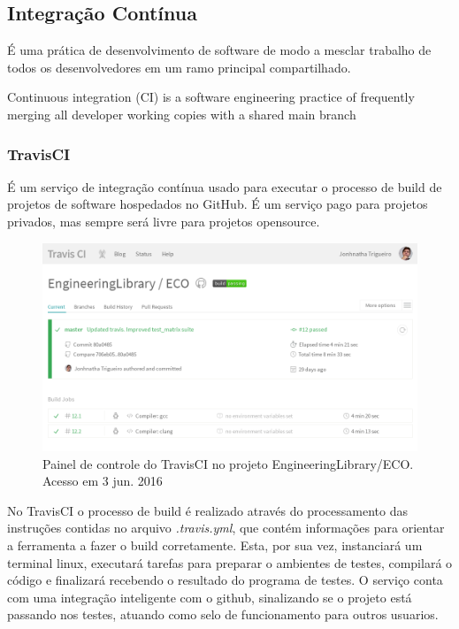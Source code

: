 \documentclass[
	article,			%
	12pt,				%
	oneside,			%
	a4paper,			%
	english,			
	brazil,
	sumario=tradicional
	]{abntex2}
\begin{document}
\pagebreak
\subsection{Integração Contínua}
É uma prática de desenvolvimento de software de modo a mesclar trabalho de todos os desenvolvedores em um ramo principal compartilhado.

\begin{citacao}
Continuous  integration  (CI)  is  a  software  engineering practice of frequently merging all developer working copies with  a  shared  main  branch
	\cite[Introduction]{vasilescu2015continuous}
\end{citacao}

\subsubsection{TravisCI}
É um serviço de integração contínua usado para executar o processo de build de projetos de software hospedados no GitHub. É um serviço pago para projetos privados, mas sempre será livre para projetos opensource. 

\begin{figure}[!h]
\centering
\includegraphics[scale=0.4]{images/travisci_dashboard.png}
\caption{Painel de controle do TravisCI no projeto EngineeringLibrary/ECO. Acesso em 3 jun. 2016}
\label{travisci_dashboard}
\end{figure}

No TravisCI o processo de build é realizado através do processamento das instruções contidas no arquivo \textit{.travis.yml}, que contém informações para orientar a ferramenta a fazer o build corretamente.
Esta, por sua vez, instanciará um terminal linux, executará tarefas para preparar o ambientes de testes, compilará o código e finalizará recebendo o resultado do programa de testes. O serviço conta com uma integração inteligente com o github, sinalizando se o projeto está passando nos testes, atuando como selo de funcionamento para outros usuarios.
\end{document}
